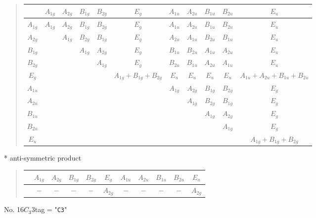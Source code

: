 \documentclass[fleqn,10pt,landscape]{jsarticle}
\begin{document}
\begin{quote}
\begin{tabular}{c|cccccccccc} \hline \hline
 & $ A_{1g} $ & $ A_{2g} $ & $ B_{1g} $ & $ B_{2g} $ & $ E_{g} $ & $ A_{1u} $ & $ A_{2u} $ & $ B_{1u} $ & $ B_{2u} $ & $ E_{u} $ \\ \hline
$ A_{1g} $ & $ A_{1g} $ & $ A_{2g} $ & $ B_{1g} $ & $ B_{2g} $ & $ E_{g} $ & $ A_{1u} $ & $ A_{2u} $ & $ B_{1u} $ & $ B_{2u} $ & $ E_{u} $ \\
$ A_{2g} $ & $  $ & $ A_{1g} $ & $ B_{2g} $ & $ B_{1g} $ & $ E_{g} $ & $ A_{2u} $ & $ A_{1u} $ & $ B_{2u} $ & $ B_{1u} $ & $ E_{u} $ \\
$ B_{1g} $ & $  $ & $  $ & $ A_{1g} $ & $ A_{2g} $ & $ E_{g} $ & $ B_{1u} $ & $ B_{2u} $ & $ A_{1u} $ & $ A_{2u} $ & $ E_{u} $ \\
$ B_{2g} $ & $  $ & $  $ & $  $ & $ A_{1g} $ & $ E_{g} $ & $ B_{2u} $ & $ B_{1u} $ & $ A_{2u} $ & $ A_{1u} $ & $ E_{u} $ \\
$ E_{g} $ & $  $ & $  $ & $  $ & $  $ & $ A_{1g} + B_{1g} + B_{2g} $ & $ E_{u} $ & $ E_{u} $ & $ E_{u} $ & $ E_{u} $ & $ A_{1u} + A_{2u} + B_{1u} + B_{2u} $ \\
$ A_{1u} $ & $  $ & $  $ & $  $ & $  $ & $  $ & $ A_{1g} $ & $ A_{2g} $ & $ B_{1g} $ & $ B_{2g} $ & $ E_{g} $ \\
$ A_{2u} $ & $  $ & $  $ & $  $ & $  $ & $  $ & $  $ & $ A_{1g} $ & $ B_{2g} $ & $ B_{1g} $ & $ E_{g} $ \\
$ B_{1u} $ & $  $ & $  $ & $  $ & $  $ & $  $ & $  $ & $  $ & $ A_{1g} $ & $ A_{2g} $ & $ E_{g} $ \\
$ B_{2u} $ & $  $ & $  $ & $  $ & $  $ & $  $ & $  $ & $  $ & $  $ & $ A_{1g} $ & $ E_{g} $ \\
$ E_{u} $ & $  $ & $  $ & $  $ & $  $ & $  $ & $  $ & $  $ & $  $ & $  $ & $ A_{1g} + B_{1g} + B_{2g} $ \\
 \hline \hline
\end{tabular}
\end{quote}
* anti-symmetric product
\begin{quote}
\begin{tabular}{ccccccccccc} \hline \hline
 & $ A_{1g} $ & $ A_{2g} $ & $ B_{1g} $ & $ B_{2g} $ & $ E_{g} $ & $ A_{1u} $ & $ A_{2u} $ & $ B_{1u} $ & $ B_{2u} $ & $ E_{u} $ \\ \hline
$  $ & $ - $ & $ - $ & $ - $ & $ - $ & $ A_{2g} $ & $ - $ & $ - $ & $ - $ & $ - $ & $ A_{2g} $ \\
 \hline \hline
\end{tabular}
\end{quote}
\newpage
No. 16\quad$C_{3}$\quad$3$\quad[ trigonal ]
tag = "{\tt C3}"
\end{document}
